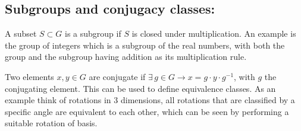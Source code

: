 \documentclass[a4paper,12pt]{article}
\begin{document}
\subsection{Subgroups and conjugacy classes:}
A subset  $S\subset G$ is a subgroup if $S$ is closed under multiplication. An example is the group of integers which is a subgroup of the real numbers, with both the group and the subgroup having addition as its multiplication rule.

Two elements $x,y\in G$ are conjugate if $\exists\,g\in G\to x=g\cdot y\cdot g^{-1}$, with $g$ the conjugating element. This can be used to define equivalence classes. As an example think of rotations in 3 dimensions, all rotations that are classified by a specific angle are equivalent to each other, which can be seen by performing a suitable rotation of basis.
\end{document}
